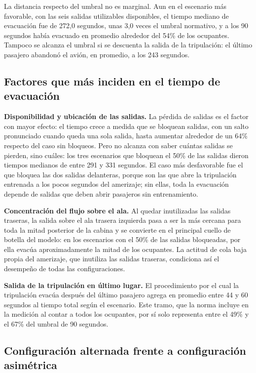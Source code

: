 \documentclass[a4paper, 11pt]{article}
\newif\ifmostraravisos
\newcommand{\pendiente}{%
  \ifmostraravisos
    \par\medskip\noindent
    \colorbox{yellow}{\parbox{\dimexpr\linewidth-2\fboxsep\relax}{\small\textbf{[ESTOS DATOS SON ANTES DE TERMINAR EL PROYECTO, UNA VEZ TERMINADO VOLVER A ESCRIBIR ESTA CONCLUSIÓN/FOTO]}}}%
    \par\medskip
  \fi}
\begin{document}
La distancia respecto del umbral no es marginal. Aun en el escenario m\'as favorable,
con las seis salidas utilizables disponibles, el tiempo mediano de evacuaci\'on fue
de 272,0 segundos, unas 3,0 veces el umbral normativo, y a los 90 segundos hab\'ia
evacuado en promedio alrededor del 54\% de los ocupantes. Tampoco se alcanza el
umbral si se descuenta la salida de la tripulaci\'on: el \'ultimo pasajero abandon\'o
el avi\'on, en promedio, a los 243 segundos.

\subsection{Factores que m\'as inciden en el tiempo de evacuaci\'on}

\pendiente

\textbf{Disponibilidad y ubicaci\'on de las salidas.} La p\'erdida de salidas es el
factor con mayor efecto: el tiempo crece a medida que se bloquean
salidas, con un salto pronunciado cuando queda una sola salida, hasta aumentar
alrededor de un 64\% respecto del caso sin bloqueos. Pero no alcanza con saber
cu\'antas salidas se pierden, sino cu\'ales: los tres escenarios que bloquean el 50\%
de las salidas dieron tiempos medianos de entre 291 y 331 segundos. El caso m\'as desfavorable fue el que bloquea
las dos salidas delanteras, porque son las que abre la tripulaci\'on entrenada a los
pocos segundos del amerizaje; sin ellas, toda la evacuaci\'on depende de salidas que
deben abrir pasajeros sin entrenamiento.

\textbf{Concentraci\'on del flujo sobre el ala.} Al quedar inutilizadas las salidas
traseras, la salida sobre el ala trasera izquierda pasa a ser la m\'as cercana para
toda la mitad posterior de la cabina y se convierte en el principal cuello de botella
del modelo: en los escenarios con el 50\% de las salidas bloqueadas, por ella
evac\'ua aproximadamente la mitad de los ocupantes. La actitud de cola baja propia
del amerizaje, que inutiliza las salidas traseras, condiciona as\'i el desempe\~no de
todas las configuraciones.

\textbf{Salida de la tripulaci\'on en \'ultimo lugar.} El procedimiento por el cual
la tripulaci\'on evac\'ua despu\'es del \'ultimo pasajero agrega en promedio entre 44 y 60
segundos al tiempo total seg\'un el escenario. Este tramo, que la norma incluye en la
medici\'on al contar a todos los ocupantes, por s\'i solo representa entre el 49\% y el 67\%
del umbral de 90 segundos.

\subsection{Configuraci\'on alternada frente a configuraci\'on asim\'etrica}
\end{document}
